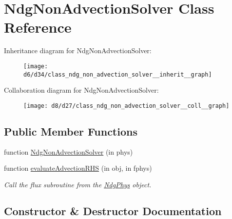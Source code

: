 \hypertarget{class_ndg_non_advection_solver}{}\section{Ndg\+Non\+Advection\+Solver Class Reference}
\label{class_ndg_non_advection_solver}


Inheritance diagram for Ndg\+Non\+Advection\+Solver\+:
\nopagebreak
\begin{figure}[H]
\begin{center}
\leavevmode
\texttt{[image: d6/d34/class\_ndg\_non\_advection\_solver\_\_inherit\_\_graph]}
\end{center}
\end{figure}


Collaboration diagram for Ndg\+Non\+Advection\+Solver\+:
\nopagebreak
\begin{figure}[H]
\begin{center}
\leavevmode
\texttt{[image: d8/d27/class\_ndg\_non\_advection\_solver\_\_coll\_\_graph]}
\end{center}
\end{figure}
\subsection*{Public Member Functions}
\begin{DoxyCompactItemize}
\item 
function \hyperlink{class_ndg_non_advection_solver_abec1226ef7534f5b8647d4c981997e48}{Ndg\+Non\+Advection\+Solver} (in phys)
\item 
function \hyperlink{class_ndg_non_advection_solver_a08e2b0980626f0e93b8ff89c7b0b88b0}{evaluate\+Advection\+R\+HS} (in obj, in fphys)
\begin{DoxyCompactList}\small\item\em Call the flux subroutine from the \hyperlink{class_ndg_phys}{Ndg\+Phys} object. \end{DoxyCompactList}\end{DoxyCompactItemize}


\subsection{Constructor \& Destructor Documentation}
\mbox{\label{class_ndg_non_advection_solver_abec1226ef7534f5b8647d4c981997e48}} 
